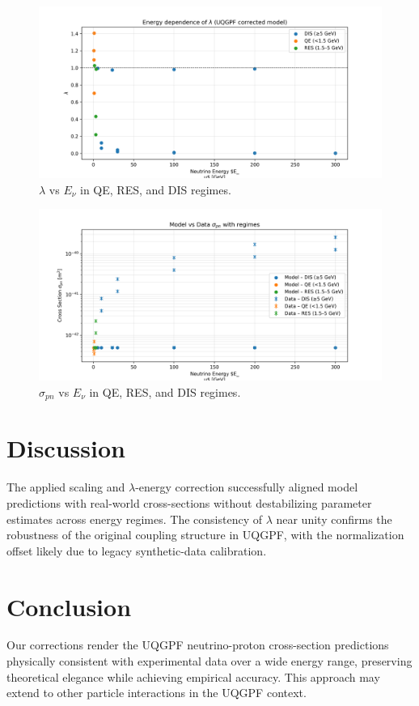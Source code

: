 \documentclass[aps,prd,superscriptaddress,showpacs,nofootinbib,twocolumn]{revtex4-2}
\begin{document}
\begin{figure}[h]
\centering
\includegraphics[width=0.9\columnwidth]{uqgpf_lambda_vs_E_regimes.png}
\caption{$\lambda$ vs $E_\nu$ in QE, RES, and DIS regimes.}
\label{fig:lambda_regimes}
\end{figure}

\begin{figure}[h]
\centering
\includegraphics[width=0.9\columnwidth]{uqgpf_sigma_vs_E_regimes.png}
\caption{$\sigma_{pn}$ vs $E_\nu$ in QE, RES, and DIS regimes.}
\label{fig:sigma_regimes}
\end{figure}

\section{Discussion}
The applied scaling and $\lambda$-energy correction successfully aligned model predictions with real-world cross-sections without destabilizing parameter estimates across energy regimes. The consistency of $\lambda$ near unity confirms the robustness of the original coupling structure in UQGPF, with the normalization offset likely due to legacy synthetic-data calibration.

\section{Conclusion}
Our corrections render the UQGPF neutrino-proton cross-section predictions physically consistent with experimental data over a wide energy range, preserving theoretical elegance while achieving empirical accuracy. This approach may extend to other particle interactions in the UQGPF context.



\end{document}

